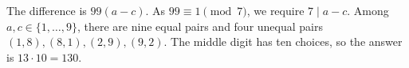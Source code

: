 The difference is $99(a-c)$. As $99\equiv1\pmod7$, we require $7\mid a-c$. Among $a,c\in\{1,\ldots,9\}$, there are nine equal pairs and four unequal pairs $(1,8),(8,1),(2,9),(9,2)$. The middle digit has ten choices, so the answer is $13\cdot10=\boxed{130}$.
